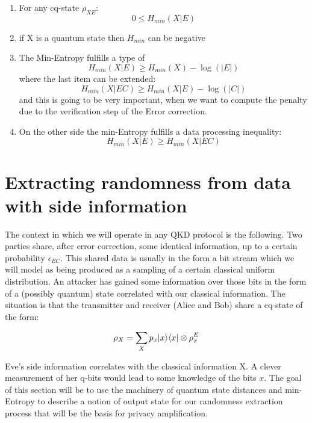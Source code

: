 \begin{enumerate}
	\item For any cq-state $\rho_{XE}$:
	      \begin{equation}
		      0 \le H_{min}(X|E)
	      \end{equation}
	\item if X is a quantum state then $H_{min}$ can be negative
	\item The Min-Entropy fulfills a type of
	      \begin{equation}
		      H_{min}(X|E) \ge H_{min}(X) - \log(|E|)
	      \end{equation}
	      where the last item can be extended:
	      \begin{equation}
		      H_{min}(X|EC) \ge H_{min}(X|E) - \log(|C|)
	      \end{equation}
	      and this is going to be very important, when we want to compute the penalty due to the verification step of the Error correction.
	\item  On the other side the min-Entropy fulfills a data processing inequality:
	      \begin{equation}
		      H_{min}(X|E) \ge H_{min}(X|EC)
	      \end{equation}
\end{enumerate}

\section{Extracting randomness from data with side information}

The context in which we will operate in any QKD protocol is the following. Two parties share, after error correction, some identical information, up to a certain probability $\epsilon_{EC}$. This shared data is usually in the form a bit stream which we will model as being produced as a sampling of a certain classical uniform distribution. An attacker has gained some information over those bits in the form of a (possibly quantum) state correlated with our classical information. The situation is that the transmitter and receiver (Alice and Bob) share a cq-state of the form:

\begin{equation} \label{eq:cq_state}
	\rho_X = \sum_X p_x\lvert x\rangle \langle x\rvert \otimes \rho^E_x
\end{equation}

Eve's side information correlates with the classical information X. A clever measurement of her q-bits would lead to some knowledge of the bits $x$.
The goal of this section will be to use the machinery of quantum state distances and min-Entropy to describe a notion of output state for our randomness extraction process that will be the basis for privacy amplification.

